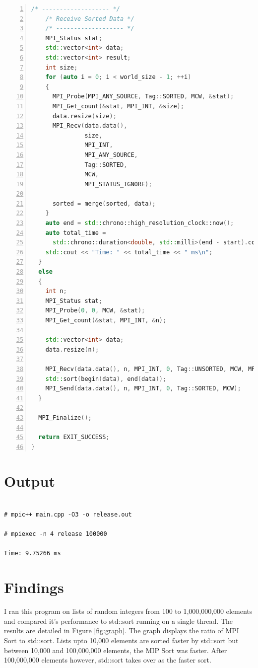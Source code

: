 \documentclass{article}
\begin{document}
\begin{lstlisting}[showstringspaces=false, language=c++, numbers=left]
    /* ------------------- */
    /* Receive Sorted Data */
    /* ------------------- */
    MPI_Status stat;
    std::vector<int> data;
    std::vector<int> result;
    int size;
    for (auto i = 0; i < world_size - 1; ++i)
    {
      MPI_Probe(MPI_ANY_SOURCE, Tag::SORTED, MCW, &stat);
      MPI_Get_count(&stat, MPI_INT, &size);
      data.resize(size);
      MPI_Recv(data.data(),
               size,
               MPI_INT,
               MPI_ANY_SOURCE,
               Tag::SORTED,
               MCW,
               MPI_STATUS_IGNORE);

      sorted = merge(sorted, data);
    }
    auto end = std::chrono::high_resolution_clock::now();
    auto total_time =
      std::chrono::duration<double, std::milli>(end - start).count();
    std::cout << "Time: " << total_time << " ms\n";
  }
  else
  {
    int n;
    MPI_Status stat;
    MPI_Probe(0, 0, MCW, &stat);
    MPI_Get_count(&stat, MPI_INT, &n);

    std::vector<int> data;
    data.resize(n);

    MPI_Recv(data.data(), n, MPI_INT, 0, Tag::UNSORTED, MCW, MPI_STATUS_IGNORE);
    std::sort(begin(data), end(data));
    MPI_Send(data.data(), n, MPI_INT, 0, Tag::SORTED, MCW);
  }

  MPI_Finalize();

  return EXIT_SUCCESS;
}
\end{lstlisting}

\section*{Output}

\begin{lstlisting}[showstringspaces=false]

# mpic++ main.cpp -O3 -o release.out

# mpiexec -n 4 release 100000

Time: 9.75266 ms

\end{lstlisting}

\section*{Findings}

I ran this program on lists of random integers from 100 to 1,000,000,000 elements and compared it's performance to std::sort running on a single thread. The results are detailed in Figure \ref{fig:graph}. The graph displays the ratio of MPI Sort to std::sort.
Lists upto 10,000 elements are sorted faster by std::sort but between 10,000 and 100,000,000 elements, the MIP Sort was faster. After 100,000,000 elements however, std::sort takes over as the faster sort.
\end{document}
